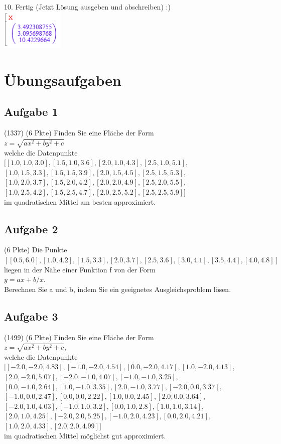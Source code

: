 \documentclass[11pt,final]{scrreprt}
\newcommand{\br} {\medskip\\}
\newcommand{\gbr} {\bigskip\\}
\begin{document}
10. Fertig (Jetzt Lösung ausgeben und abschreiben) :)\\

\includegraphics[width=3cm]{images/gaussausgleich/10.png}

\newpage
\section{Übungsaufgaben}

\subsection{Aufgabe 1} (1337) (6 Pkte)
Finden Sie eine Fläche der Form\br
$z =\sqrt{ax^2 + by^2 + c}$\br
welche die Datenpunkte\\
$[[1.0, 1.0, 3.0], [1.5, 1.0, 3.6], [2.0, 1.0, 4.3], [2.5, 1.0, 5.1],$\\
$[1.0, 1.5, 3.3], [1.5, 1.5, 3.9], [2.0, 1.5, 4.5], [2.5, 1.5, 5.3],$\\
$[1.0, 2.0, 3.7], [1.5, 2.0, 4.2], [2.0, 2.0, 4.9], [2.5, 2.0, 5.5],$\\
$[1.0, 2.5, 4.2], [1.5, 2.5, 4.7], [2.0, 2.5, 5.2], [2.5, 2.5, 5.9]]$\\
im quadratischen Mittel am besten approximiert.\gbr

\subsection{Aufgabe 2} (6 Pkte) Die Punkte\\
$[[0.5, 6.0], [1.0, 4.2], [1.5, 3.3], [2.0, 3.7], [2.5, 3.6], [3.0, 4.1], [3.5, 4.4], [4.0, 4.8]]$\\
liegen in der Nähe einer Funktion f von der Form\br
$y = ax + b/x.$\br
Berechnen Sie a und b, indem Sie ein geeignetes Ausgleichsproblem lösen.\gbr

\subsection{Aufgabe 3} (1499) (6 Pkte) Finden Sie eine Fläche der Form\br
$z =\sqrt{ax^2 + by^2 + c},$\br
welche die Datenpunkte\\
$[[-2.0, -2.0, 4.83], [-1.0, -2.0, 4.54], [0.0, -2.0, 4.17], [1.0, -2.0, 4.13],$\\
$[2.0, -2.0, 5.07], [-2.0, -1.0, 4.07], [-1.0, -1.0, 3.25],$\\
$[0.0, -1.0, 2.64], [1.0, -1.0, 3.35], [2.0, -1.0, 3.77], [-2.0, 0.0, 3.37],$\\
$[-1.0, 0.0, 2.47], [0.0, 0.0, 2.22], [1.0, 0.0, 2.45], [2.0, 0.0, 3.64],$\\
$[-2.0, 1.0, 4.03], [-1.0, 1.0, 3.2], [0.0, 1.0, 2.8], [1.0, 1.0, 3.14],$\\
$[2.0, 1.0, 4.25], [-2.0, 2.0, 5.25], [-1.0, 2.0, 4.23], [0.0, 2.0, 4.21],$\\
$[1.0, 2.0, 4.33], [2.0, 2.0, 4.99]]$\\
im quadratischen Mittel möglichst gut approximiert.\gbr
\end{document}
